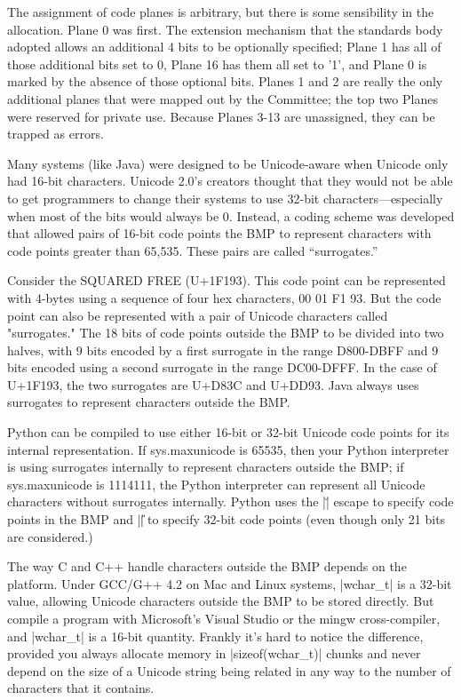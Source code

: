 The assignment of code planes is arbitrary, but there is some
sensibility in the allocation. Plane 0 was first. The extension
mechanism that the standards body adopted allows an additional 4 bits
to be optionally specified; Plane 1 has all of those additional bits
set to 0, Plane 16 has them all set to '1', and Plane 0 is marked by
the absence of those optional bits. Planes 1 and 2 are really the only
additional planes that were mapped out by the Committee; the top two
Planes were reserved for private use. Because Planes 3-13 are
unassigned, they can be trapped as errors.

Many systems (like Java) were designed to be Unicode-aware when
Unicode only had 16-bit characters.  Unicode 2.0's creators thought
that they would not be able to get programmers to change their systems
to use 32-bit characters---especially when most of the bits would
always be 0. Instead, a coding scheme was developed that allowed pairs
of 16-bit code points the BMP to represent characters with code points
greater than 65,535. These pairs are called ``surrogates.''

Consider the SQUARED FREE (U+1F193). This code point can be
represented with 4-bytes using a sequence of four hex characters, 00
01 F1 93. But the code point can also be represented with a pair of
Unicode characters called "surrogates." The 18 bits of code points
outside the BMP to be divided into two halves, with 9 bits encoded by
a first surrogate in the range D800-DBFF and 9 bits encoded using a
second surrogate in the range DC00-DFFF. In the case of U+1F193, the
two surrogates are U+D83C and U+DD93. Java always uses surrogates to
represent characters outside the BMP.

Python can be compiled to use either 16-bit or 32-bit Unicode code
points for its internal representation. If sys.maxunicode is 65535,
then your Python interpreter is using surrogates internally to
represent characters outside the BMP; if sys.maxunicode is 1114111,
the Python interpreter can represent all Unicode characters without
surrogates internally. Python uses the |\u| escape to specify code
points in the BMP and |\U| to specify 32-bit code points (even though
only 21 bits are considered.)

The way C and C++ handle characters outside the BMP depends on the
platform.  Under GCC/G++ 4.2 on Mac and Linux systems, |wchar_t| is a
32-bit value, allowing Unicode characters outside the BMP to be stored
directly. But compile a program with Microsoft's Visual Studio or the
mingw cross-compiler, and |wchar_t| is a 16-bit quantity. Frankly it's
hard to notice the difference, provided you always allocate memory in
|sizeof(wchar_t)| chunks and never depend on the size of a Unicode
string being related in any way to the number of characters that it
contains.  

